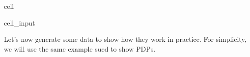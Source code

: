 \documentclass[letterpaper,10pt,english]{jupyterBook}
\begin{document}
\begin{sphinxuseclass}{cell}
\begin{sphinxVerbatimInput}
\begin{sphinxuseclass}{cell_input}
\begin{sphinxVerbatim}[commandchars=\\\{\}]
        \PYG{p}{[}\PYG{p}{]}  \PYG{p}{[}\PYG{p}{]}  \PYG{p}{[}\PYG{p}{]}
    
      
      
    
     \PYG{p}{[}\PYG{p}{]} 
\end{sphinxVerbatim}

\end{sphinxuseclass}\end{sphinxVerbatimInput}

\end{sphinxuseclass}
\sphinxAtStartPar
Let’s now generate some data to show how they work in practice. For simplicity, we will use the same example sued to show PDPs.
\end{document}
